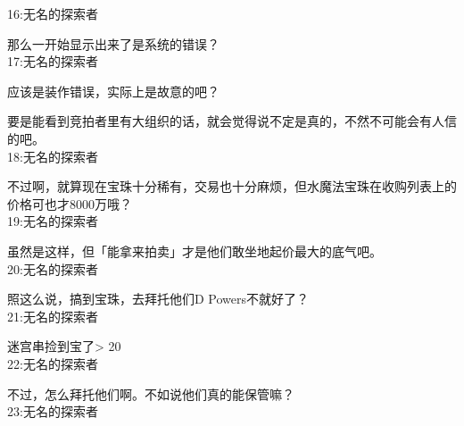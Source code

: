 16:无名的探索者

那么一开始显示出来了是系统的错误？\\

17:无名的探索者

应该是装作错误，实际上是故意的吧？

要是能看到竞拍者里有大组织的话，就会觉得说不定是真的，不然不可能会有人信的吧。\\

18:无名的探索者

不过啊，就算现在宝珠十分稀有，交易也十分麻烦，但水魔法宝珠在收购列表上的价格可也才8000万哦？\\

19:无名的探索者

虽然是这样，但「能拿来拍卖」才是他们敢坐地起价最大的底气吧。\\

20:无名的探索者

照这么说，搞到宝珠，去拜托他们D Powers不就好了？\\

21:无名的探索者

迷宫串捡到宝了> 20\\

22:无名的探索者

不过，怎么拜托他们啊。不如说他们真的能保管嘛？\\

23:无名的探索者

